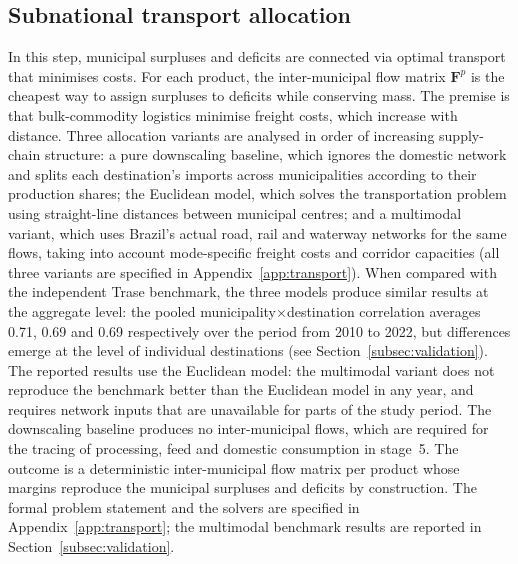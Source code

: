 \documentclass[pdflatex,sn-nature]{sn-jnl}%
\begin{document}
\subsection{Subnational transport allocation}\label{subsec:transport}
In this step, municipal surpluses and deficits are connected via optimal
transport that minimises costs. For each product, the inter-municipal flow
matrix $\mathbf{F}^p$ is the cheapest way to assign surpluses to deficits
while conserving mass. The premise is that bulk-commodity logistics
minimise freight costs, which increase with distance. Three allocation
variants are analysed in order of increasing supply-chain structure: a
pure downscaling baseline, which ignores the domestic network and
splits each destination's imports across municipalities according to their
production shares; the Euclidean model, which solves the
transportation problem using straight-line distances between municipal
centres; and a multimodal variant, which uses Brazil's actual road,
rail and waterway networks for the same flows, taking into account
mode-specific freight costs and corridor capacities (all three variants
are specified in Appendix~\ref{app:transport}). When compared with the
independent Trase benchmark, the three models produce similar results at
the aggregate level: the pooled municipality$\times$destination
correlation averages 0.71, 0.69 and 0.69 respectively over the period from
2010 to 2022, but differences emerge at the level of individual
destinations (see Section~\ref{subsec:validation}). The reported results
use the Euclidean model: the multimodal variant does not reproduce the
benchmark better than the Euclidean model in any year, and requires
network inputs that are unavailable for parts of the study period. The
downscaling baseline produces no inter-municipal flows, which are required
for the tracing of processing, feed and domestic consumption in stage~5.
The outcome is a deterministic inter-municipal flow
matrix per product whose margins reproduce the municipal surpluses and
deficits by construction. \textcolor{green!50!black}{The formal
problem statement and the solvers are specified in
Appendix~\ref{app:transport}; the multimodal benchmark results are
reported in Section~\ref{subsec:validation}.}

\end{document}
